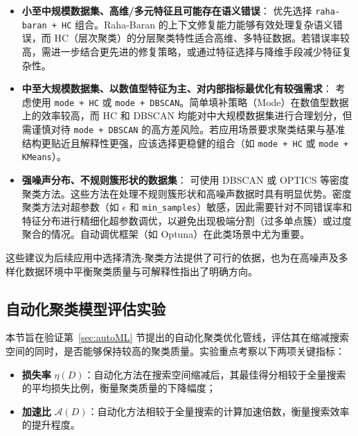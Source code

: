 \documentclass[10pt]{article} %
\numberwithin{equation}{section}
\begin{document}
\begin{itemize}
    \item \textbf{小至中规模数据集、高维/多元特征且可能存在语义错误}：
    优先选择 \texttt{raha-baran + HC} 组合。Raha-Baran 的上下文修复能力能够有效处理复杂语义错误，而 HC（层次聚类）的分层聚类特性适合高维、多特征数据。若错误率较高，需进一步结合更先进的修复策略，或通过特征选择与降维手段减少特征复杂性。

    \item \textbf{中至大规模数据集、以数值型特征为主、对内部指标最优化有较强需求}：
    考虑使用 \texttt{mode + HC} 或 \texttt{mode + DBSCAN}。简单填补策略（Mode）在数值型数据上的效率较高，而 HC 和 DBSCAN 均能对中大规模数据集进行合理划分，但需谨慎对待 \texttt{mode + DBSCAN} 的高方差风险。若应用场景要求聚类结果与基准结构更贴近且解释性更强，应该选择更稳健的组合（如 \texttt{mode + HC} 或 \texttt{mode + KMeans}）。

    \item \textbf{强噪声分布、不规则簇形状的数据集}：
    可使用 DBSCAN 或 OPTICS 等密度聚类方法。这些方法在处理不规则簇形状和高噪声数据时具有明显优势。密度聚类方法对超参数（如 $\epsilon$ 和 \texttt{min\_samples}）敏感，因此需要针对不同错误率和特征分布进行精细化超参数调优，以避免出现极端分割（过多单点簇）或过度聚合的情况。自动调优框架（如 Optuna）在此类场景中尤为重要。
\end{itemize}

这些建议为后续应用中选择清洗-聚类方法提供了可行的依据，也为在高噪声及多样化数据环境中平衡聚类质量与可解释性指出了明确方向。

\subsection{自动化聚类模型评估实验}
\label{sec:automl_exp}

本节旨在验证第~\ref{sec:autoML} 节提出的自动化聚类优化管线，评估其在缩减搜索空间的同时，是否能够保持较高的聚类质量。实验重点考察以下两项关键指标：
\begin{itemize}
    \item \textbf{损失率} \(\eta(D)\)：自动化方法在搜索空间缩减后，其最佳得分相较于全量搜索的平均损失比例，衡量聚类质量的下降幅度；
    \item \textbf{加速比} \(\mathcal{A}(D)\)：自动化方法相较于全量搜索的计算加速倍数，衡量搜索效率的提升程度。
\end{itemize}
\end{document}

